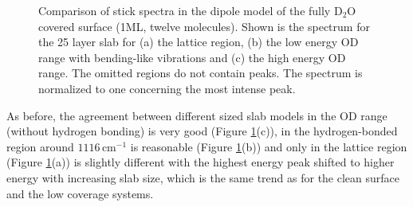 \documentclass[11pt,DIV=13,BCOR=5mm,a4paper,headinclude]{scrbook}
\begin{document}
 \begin{figure} [!h]
 \centering
              \quad
              \quad
 \caption{Comparison of stick spectra in the dipole model of the fully D$_2$O covered surface (1ML, twelve molecules).
Shown is the spectrum for the 25 layer slab for (a) the lattice region, (b) the low energy OD range with bending-like vibrations and (c) the high energy OD range.
The omitted regions do not contain peaks.
The spectrum is normalized to one concerning the most intense peak.} 
        \label{abb:fullyhydrox_spec}
\end{figure}
As before, the agreement between different sized slab models in the OD range (without hydrogen bonding) is very good (Figure \ref{abb:fullyhydrox_spec}(c)), in the hydrogen-bonded region around $1116\,$cm$^{-1}$ is reasonable (Figure \ref{abb:fullyhydrox_spec}(b)) and only in the lattice region (Figure \ref{abb:fullyhydrox_spec}(a)) is slightly different with the highest energy peak shifted to higher energy with increasing slab size, which is the same trend as for the clean surface and the low coverage systems.
\end{document}
